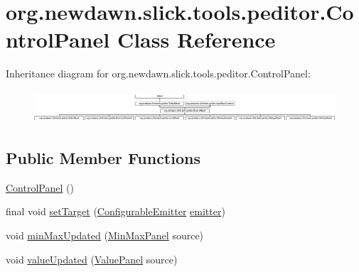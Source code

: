 \hypertarget{classorg_1_1newdawn_1_1slick_1_1tools_1_1peditor_1_1_control_panel}{}\section{org.\+newdawn.\+slick.\+tools.\+peditor.\+Control\+Panel Class Reference}
\label{classorg_1_1newdawn_1_1slick_1_1tools_1_1peditor_1_1_control_panel}
Inheritance diagram for org.\+newdawn.\+slick.\+tools.\+peditor.\+Control\+Panel\+:\begin{figure}[H]
\begin{center}
\leavevmode
\includegraphics[height=1.220044cm]{classorg_1_1newdawn_1_1slick_1_1tools_1_1peditor_1_1_control_panel}
\end{center}
\end{figure}
\subsection*{Public Member Functions}
\begin{DoxyCompactItemize}
\item 
\mbox{\hyperlink{classorg_1_1newdawn_1_1slick_1_1tools_1_1peditor_1_1_control_panel_ad200a221101890f1d49dd45e48e70a33}{Control\+Panel}} ()
\item 
final void \mbox{\hyperlink{classorg_1_1newdawn_1_1slick_1_1tools_1_1peditor_1_1_control_panel_a83d17b9ce4698ad051b90a27e9bc08d0}{set\+Target}} (\mbox{\hyperlink{classorg_1_1newdawn_1_1slick_1_1particles_1_1_configurable_emitter}{Configurable\+Emitter}} \mbox{\hyperlink{classorg_1_1newdawn_1_1slick_1_1tools_1_1peditor_1_1_control_panel_aaa170169fa574cb6b271f782afcd2517}{emitter}})
\item 
void \mbox{\hyperlink{classorg_1_1newdawn_1_1slick_1_1tools_1_1peditor_1_1_control_panel_ae8f9c3f55e43dad862c8520af7c3fac8}{min\+Max\+Updated}} (\mbox{\hyperlink{classorg_1_1newdawn_1_1slick_1_1tools_1_1peditor_1_1_min_max_panel}{Min\+Max\+Panel}} source)
\item 
void \mbox{\hyperlink{classorg_1_1newdawn_1_1slick_1_1tools_1_1peditor_1_1_control_panel_ae266146cfb9e0f2868c04e510a6ddb43}{value\+Updated}} (\mbox{\hyperlink{classorg_1_1newdawn_1_1slick_1_1tools_1_1peditor_1_1_value_panel}{Value\+Panel}} source)
\end{DoxyCompactItemize}
